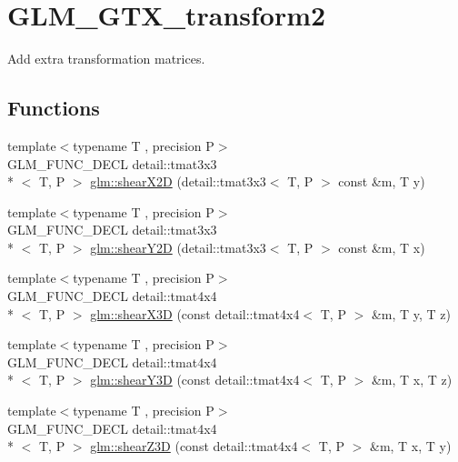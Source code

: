 \hypertarget{group__gtx__transform2}{\section{G\-L\-M\-\_\-\-G\-T\-X\-\_\-transform2}
\label{group__gtx__transform2}
}


Add extra transformation matrices.  


\subsection*{Functions}
\begin{DoxyCompactItemize}
\item 
{\footnotesize template$<$typename T , precision P$>$ }\\G\-L\-M\-\_\-\-F\-U\-N\-C\-\_\-\-D\-E\-C\-L detail\-::tmat3x3\\*
$<$ T, P $>$ \hyperlink{group__gtx__transform2_gaa5a2d9216b3298b03252e549de6fd98a}{glm\-::shear\-X2\-D} (detail\-::tmat3x3$<$ T, P $>$ const \&m, T y)
\item 
{\footnotesize template$<$typename T , precision P$>$ }\\G\-L\-M\-\_\-\-F\-U\-N\-C\-\_\-\-D\-E\-C\-L detail\-::tmat3x3\\*
$<$ T, P $>$ \hyperlink{group__gtx__transform2_ga1f5e68ada7a56cdf86c0c56d0b0a1832}{glm\-::shear\-Y2\-D} (detail\-::tmat3x3$<$ T, P $>$ const \&m, T x)
\item 
{\footnotesize template$<$typename T , precision P$>$ }\\G\-L\-M\-\_\-\-F\-U\-N\-C\-\_\-\-D\-E\-C\-L detail\-::tmat4x4\\*
$<$ T, P $>$ \hyperlink{group__gtx__transform2_gaae5bbb490a3d798b083cbec0e0c2e94c}{glm\-::shear\-X3\-D} (const detail\-::tmat4x4$<$ T, P $>$ \&m, T y, T z)
\item 
{\footnotesize template$<$typename T , precision P$>$ }\\G\-L\-M\-\_\-\-F\-U\-N\-C\-\_\-\-D\-E\-C\-L detail\-::tmat4x4\\*
$<$ T, P $>$ \hyperlink{group__gtx__transform2_ga4b5af90ecf76d312bb371f6111e1ae35}{glm\-::shear\-Y3\-D} (const detail\-::tmat4x4$<$ T, P $>$ \&m, T x, T z)
\item 
{\footnotesize template$<$typename T , precision P$>$ }\\G\-L\-M\-\_\-\-F\-U\-N\-C\-\_\-\-D\-E\-C\-L detail\-::tmat4x4\\*
$<$ T, P $>$ \hyperlink{group__gtx__transform2_ga02fa747667daf42b64ea344d1076acee}{glm\-::shear\-Z3\-D} (const detail\-::tmat4x4$<$ T, P $>$ \&m, T x, T y)

\end{DoxyCompactItemize}
